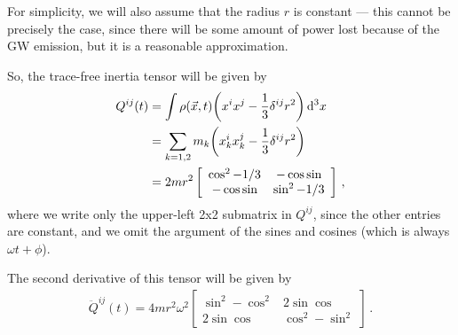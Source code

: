 \documentclass[main.tex]{subfiles}
\begin{document}
For simplicity, we will also assume that the radius \(r\) is constant --- this cannot be precisely the case, since there will be some amount of power lost because of the GW emission, but it is a reasonable approximation.

So, the trace-free inertia tensor will be given by 
%
\begin{align}
Q^{ij} (t) &= \int \rho (\vec{x}, t) \qty( x^{i} x^{j} - \frac{1}{3} \delta^{ij} r^2) \dd[3]{x}  \\
&= \sum _{k=1, 2} m_k \qty(x_k^{i} x_k^{j} - \frac{1}{3} \delta^{ij} r^2)  \\
&= 2 m r^2 \left[\begin{array}{cc}
\cos^2 - 1/3 & - \cos \sin \\ 
- \cos \sin & \sin^2 - 1/3  
\end{array}\right] 
\,,
\end{align}
%
where we write only the upper-left 2x2 submatrix in \(Q^{ij}\), since the other entries are constant, and we omit the argument of the sines and cosines (which is always \(\omega t + \phi \)). 

The second derivative of this tensor will be given by 
%
\begin{align}
\ddot{Q}^{ij}(t) = 4 m r^2 \omega^2 \left[\begin{array}{cc}
\sin^2 - \cos^2 & 2 \sin \cos \\ 
2 \sin \cos & \cos^2 - \sin^2
\end{array}\right]
\,.
\end{align}
\end{document}
